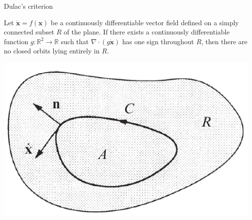 \documentclass[usenames,dvipsnames,svgnames,10pt,aspectratio=169]{beamer}
\begin{document}
\begin{frame}[t, c]{Dulac's criterion}{}
  \begin{minipage}{.68\textwidth}
    Let $\dot{\bm{x}} = f(\bm{x})$ be a continuously differentiable vector field defined on a simply connected subset $R$ of the plane.
    If there exists a continuously differentiable function $g : \mathbb{R}^2 \to \mathbb{R}$ such that $\nabla \cdot \left( g \dot{\bm{x}} \right)$ has one sign throughout $R$, then there are no closed orbits lying entirely in $R$.
  \end{minipage}%
  \hfill
  \begin{minipage}{.28\textwidth}
    \centering
    \includegraphics[width=\textwidth]{dulac}
  \end{minipage}
\end{frame}

\frame{}
\end{document}
